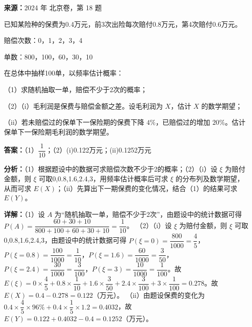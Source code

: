 \begin{question}[points=14]
\textbf{来源：}2024 年 北京卷，第 18 题\par
已知某险种的保费为0.4万元，前3次出险每次赔付0.8万元，第4次赔付0.6万元。

赔偿次数：0，1，2，3，4

单数：800，100，60，30，10

在总体中抽样100单，以频率估计概率：

（1）求随机抽取一单，赔偿不少于2次的概率；

（2）（i）毛利润是保费与赔偿金额之差。设毛利润为 $X$，估计 $X$ 的数学期望；

（ii）若未赔偿过的保单下一保险期的保费下降 $4\%$，已赔偿过的增加 $20\%$。估计保单下一保险期毛利润的数学期望。
\begin{solution}
\textbf{答案：}（1）$\dfrac{1}{10}$；（2）(i)0.122万元；(ii)0.1252万元

\textbf{分析：}（1）根据题设中的数据可求赔偿次数不少于2的概率；（2）（i）设 $\xi$ 为赔付金额，则 $\xi$ 可取0,0.8,1.6,2.4,3，用频率估计概率后可求 $\xi$ 的分布列及数学期望，从而可求 $E(X)$；（ii）先算出下一期保费的变化情况，结合（1）的结果可求 $E(Y)$。

\textbf{详解：}（1）设 $A$ 为“随机抽取一单，赔偿不少于2次”，由题设中的统计数据可得 $P(A) = \dfrac{60+30+10}{800+100+60+30+10} = \dfrac{1}{10}$。
（2）（i）设 $\xi$ 为赔付金额，则 $\xi$ 可取0,0.8,1.6,2.4,3，由题设中的统计数据可得 $P(\xi=0)=\dfrac{800}{1000}=\dfrac{4}{5}$，$P(\xi=0.8)=\dfrac{100}{1000}=\dfrac{1}{10}$，$P(\xi=1.6)=\dfrac{60}{1000}=\dfrac{3}{50}$，$P(\xi=2.4)=\dfrac{30}{1000}=\dfrac{3}{100}$，$P(\xi=3)=\dfrac{10}{1000}=\dfrac{1}{100}$。故 $E(\xi)=0\times\dfrac{4}{5}+0.8\times\dfrac{1}{10}+1.6\times\dfrac{3}{50}+2.4\times\dfrac{3}{100}+3\times\dfrac{1}{100}=0.278$。故 $E(X)=0.4-0.278=0.122$（万元）。
（ii）由题设保费的变化为 $0.4\times\dfrac{4}{5}\times96\% + 0.4\times\dfrac{1}{5}\times1.2 = 0.4032$，故 $E(Y)=0.122+0.4032-0.4=0.1252$（万元）。
\end{solution}
\end{question}

